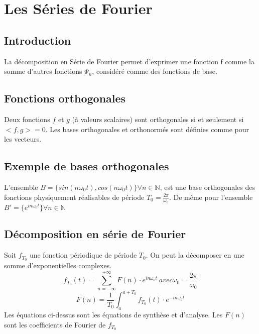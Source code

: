 \documentclass[10pt,a4paper,twoside]{article}
\begin{document}
\section{Les Séries de Fourier}
\subsection{Introduction}
La décomposition en Série de Fourier permet d'exprimer une fonction f comme la somme d'autres fonctions $\Psi_{n}$, considéré comme des fonctions de base.

\subsection{Fonctions orthogonales}
Deux fonctions $f$ et $g$ (à valeurs scalaires) sont orthogonales si et seulement si $<f,g>=0$. Les bases orthogonales et orthonormés sont définies comme pour les vecteurs.

\subsection{Exemple de bases orthogonales}
L'ensemble $B=\{sin(n\omega_{0}t),cos(n\omega_{0}t)\} \forall n \in \mathbb{N}$, est une base orthogonales des fonctions physiquement réalisables de période $T_{0}=\frac{2\pi}{\omega_{0}}$. De même pour l'ensemble $B'=\{e^{in\omega_{0}t}\} \forall n \in \mathbb{N}$

\subsection{Décomposition en série de Fourier}
Soit $f_{T_{0}}$ une fonction périodique de période $T_{0}$. On peut la décomposer en une somme d'exponentielles complexes. 
\[f_{T_{0}}(t)=\sum_{n=-\infty}^{+\infty}F(n)\cdot e^{in\omega_{0}t}\ avec \omega_{0} = \frac{2\pi}{\omega_{0}}\]
\[F(n)=\frac{1}{T_{0}} \int_{a}^{a+T_{0}} f_{T_{0}}(t)\cdot e^{-in\omega_{0}t}\]
Les équations ci-dessus sont les équations de synthèse et d'analyse. Les $F(n)$ sont les coefficients de Fourier de $f_{T_{0}}$
\end{document}
